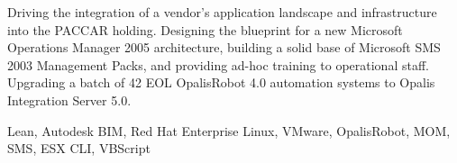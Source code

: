 \begin{experiences}
{\begin{itemize}
                        \linebreak Driving the integration of a vendor's application landscape and infrastructure into the PACCAR holding.
                        \linebreak Designing the blueprint for a new Microsoft Operations Manager 2005 architecture, building a solid base of Microsoft SMS 2003 Management Packs, and providing ad-hoc training to operational staff.
                        \linebreak Upgrading a batch of 42 EOL OpalisRobot 4.0 automation systems to Opalis Integration Server 5.0.
                      \end{itemize}
                    }
                    {Lean, Autodesk BIM, Red Hat Enterprise Linux, VMware, OpalisRobot, MOM, SMS, ESX CLI, VBScript}
\end{experiences}